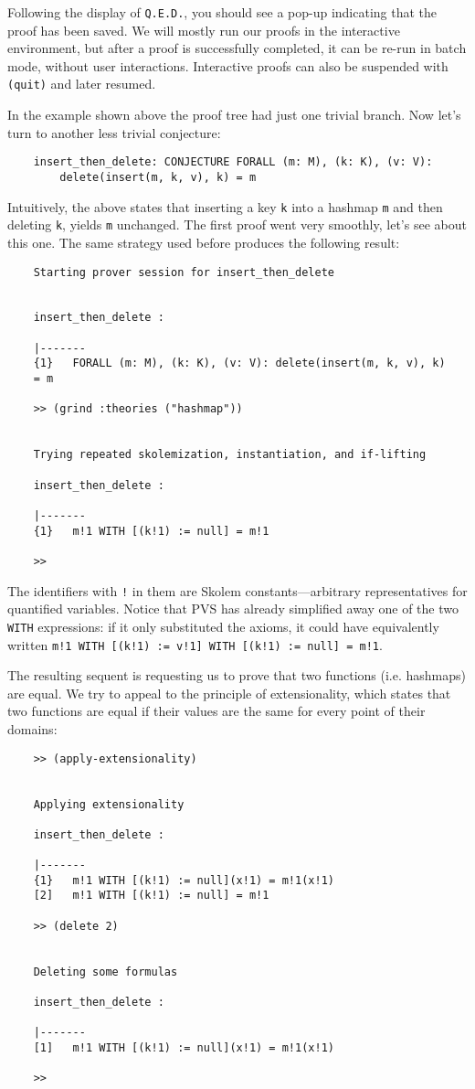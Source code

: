 Following the display of \texttt{Q.E.D.}, you should see a pop-up indicating that the proof has been saved.
We will mostly run our proofs in the interactive environment, but after a proof is successfully completed, it can be re-run in batch mode, without user interactions.
Interactive proofs can also be suspended with \texttt{(quit)} and later resumed.

In the example shown above the proof tree had just one trivial branch. Now let's turn to another less trivial conjecture:

\begin{verbatim}
	insert_then_delete: CONJECTURE FORALL (m: M), (k: K), (v: V):
	    delete(insert(m, k, v), k) = m
\end{verbatim}

Intuitively, the above states that inserting a key \texttt{k} into a hashmap \texttt{m} and then deleting \texttt{k}, yields \texttt{m} unchanged.
The first proof went very smoothly, let's see about this one.
The same strategy used before produces the following result:


\begin{verbatim}
	Starting prover session for insert_then_delete
	
	
	insert_then_delete :
	
	|------- 
	{1}   FORALL (m: M), (k: K), (v: V): delete(insert(m, k, v), k)
	= m
	
	>> (grind :theories ("hashmap"))
	
	
	Trying repeated skolemization, instantiation, and if-lifting
	
	insert_then_delete :
	
	|-------
	{1}   m!1 WITH [(k!1) := null] = m!1
	
	>> 
\end{verbatim}

The identifiers with \texttt{!} in them are Skolem constants---arbitrary representatives for quantified variables.
Notice that PVS has already simplified away one of the two \texttt{WITH} expressions: if it only substituted the axioms, it could have equivalently written \texttt{m!1 WITH [(k!1) := v!1] WITH [(k!1) := null] = m!1}.

The resulting sequent is requesting us to prove that two functions (i.e. hashmaps) are equal.
We try to appeal to the principle of extensionality, which states that two functions are equal if their values are the same for every point of their domains:

\begin{verbatim}
	>> (apply-extensionality)
	
	
	Applying extensionality
	
	insert_then_delete :
	
	|-------
	{1}   m!1 WITH [(k!1) := null](x!1) = m!1(x!1)
	[2]   m!1 WITH [(k!1) := null] = m!1
	
	>> (delete 2)
	
	
	Deleting some formulas
	
	insert_then_delete :
	
	|-------
	[1]   m!1 WITH [(k!1) := null](x!1) = m!1(x!1)
	
	>> 
\end{verbatim}

